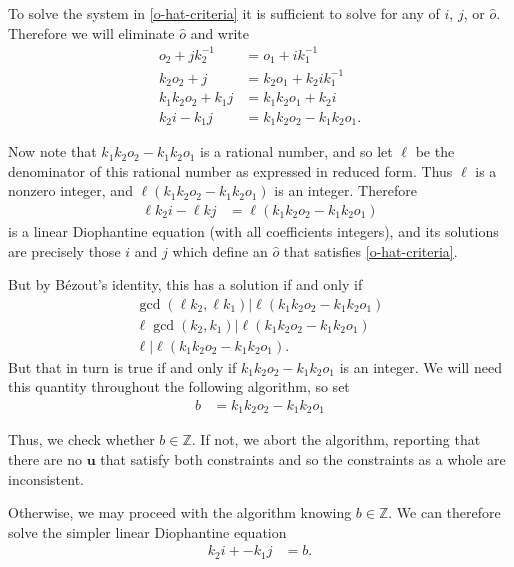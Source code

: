 \documentclass[11pt]{article}
\newcommand{\vect}[1]{\mathbf{#1}}
\begin{document}
To solve the system in \eqref{o-hat-criteria} it is sufficient to solve for any of $i$, $j$, or $\widehat{o}$. Therefore we will eliminate $\widehat{o}$ and write
\begin{align*}
o_2 + j k_2^{-1} &= o_1 + i k_1^{-1} \\
k_2 o_2 + j &= k_2 o_1 + k_2 i k_1^{-1} \\
k_1 k_2 o_2 + k_1 j &= k_1 k_2 o_1 + k_2 i \\
k_2 i - k_1 j &= k_1 k_2 o_2 - k_1 k_2 o_1.
\end{align*}

Now note that $k_1 k_2 o_2 - k_1 k_2 o_1$ is a rational number, and so let $\ell$ be the denominator of this rational number as expressed in reduced form. Thus $\ell$ is a nonzero integer, and $\ell(k_1 k_2 o_2 - k_1 k_2 o_1)$ is an integer. Therefore
\begin{align*}
\ell k_2 i - \ell k j &= \ell(k_1 k_2 o_2 - k_1 k_2 o_1)
\end{align*}
is a linear Diophantine equation (with all coefficients integers), and its solutions are precisely those $i$ and $j$ which define an $\widehat{o}$ that satisfies \eqref{o-hat-criteria}.

But by B\'{e}zout's identity, this has a solution if and only if
\begin{align*}
\gcd(\ell k_2, \ell k_1) \vert \ell(k_1 k_2 o_2 - k_1 k_2 o_1) \\
\ell\gcd(k_2, k_1) \vert \ell(k_1 k_2 o_2 - k_1 k_2 o_1) \\
\ell \vert \ell(k_1 k_2 o_2 - k_1 k_2 o_1).
\end{align*}
But that in turn is true if and only if $k_1 k_2 o_2 - k_1 k_2 o_1$ is an integer. We will need this quantity throughout the following algorithm, so set
\begin{align}
b &= k_1 k_2 o_2 - k_1 k_2 o_1 \label{b-def}
\end{align}

Thus, we check whether $b \in \mathbb{Z}$. If not, we abort the algorithm, reporting that there are no $\vect{u}$ that satisfy both constraints and so the constraints as a whole are inconsistent.

Otherwise, we may proceed with the algorithm knowing $b \in \mathbb{Z}$. We can therefore solve the simpler linear Diophantine equation
\begin{align*}
k_2 i + - k_1 j &= b.
\end{align*}
\end{document}
